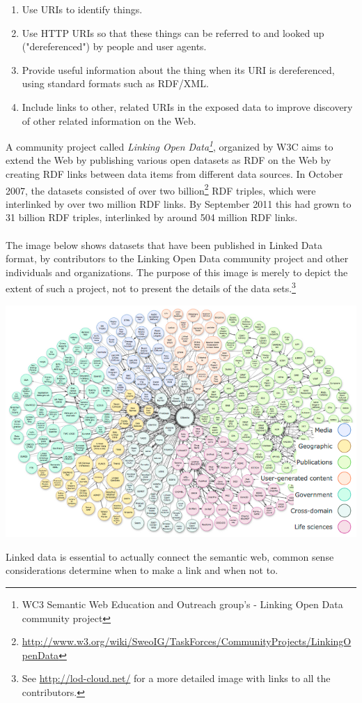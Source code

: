 \begin{enumerate}
\item{Use URIs to identify things.}
\item{Use HTTP URIs so that these things can be referred to and looked up ("dereferenced") by people and user agents.}
\item{Provide useful information about the thing when its URI is dereferenced, using standard formats such as RDF/XML.}
\item{Include links to other, related URIs in the exposed data to improve discovery of other related information on the Web.}
\end{enumerate}
A community project called \textit{Linking Open Data\footnote{WC3 Semantic Web Education and Outreach group's - Linking Open Data community project}}, organized by W3C aims to extend the Web by publishing various open datasets as RDF on the Web by creating RDF links between data items from different data sources. In October 2007, the datasets consisted of over two billion\footnote{\url{http://www.w3.org/wiki/SweoIG/TaskForces/CommunityProjects/LinkingOpenData}} RDF triples, which were interlinked by over two million RDF links. By September 2011 this had grown to 31 billion RDF triples, interlinked by around 504 million RDF links.\\\\
The image below shows datasets that have been published in Linked Data format, by contributors to the Linking Open Data community project and other individuals and organizations. The purpose of this image is merely to depict the extent of such a project, not to present the details of the data sets.\footnote{See \url{http://lod-cloud.net/} for a more detailed image with links to all the contributors.}
\begin{center}
\includegraphics[scale=0.6]{../imgs/lod-datasets.png}
\end{center}
Linked data is essential to actually connect the semantic web, common sense considerations determine when to make a link and when not to.\cite{publishBib}

